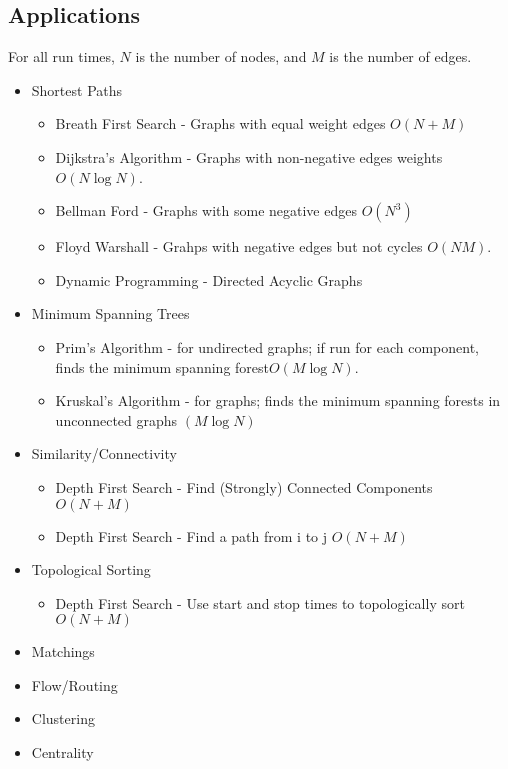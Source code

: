 \subsection{Applications}
For all run times, $N$ is the number of nodes, and $M$ is the number of edges.
\begin{itemize}
    \item Shortest Paths
        \begin{itemize}
            \item Breath First Search - Graphs with equal weight edges $O(N+M)$
            \item Dijkstra's Algorithm - Graphs with non-negative edges weights $O(N \log N)$.
            \item Bellman Ford - Graphs with some negative edges $O(N^3)$
            \item Floyd Warshall - Grahps with negative edges but not cycles $O(NM)$.
            \item Dynamic Programming - Directed Acyclic Graphs
        \end{itemize}
    \item Minimum Spanning Trees 
        \begin{itemize}
            \item Prim's Algorithm - for undirected graphs; if run for each component, finds the minimum spanning forest$O(M \log N)$.
            \item Kruskal's Algorithm - for graphs; finds the minimum spanning forests in unconnected graphs $(M \log N)$
        \end{itemize}
    \item Similarity/Connectivity
        \begin{itemize}
            \item Depth First Search - Find (Strongly) Connected Components $O(N+M)$
            \item Depth First Search - Find a path from i to j $O(N+M)$
        \end{itemize}
    \item Topological Sorting 
        \begin{itemize}
            \item Depth First Search - Use start and stop times to topologically sort $O(N+M)$
        \end{itemize}
    \item Matchings
    \item Flow/Routing
    \item Clustering
    \item Centrality
\end{itemize}

